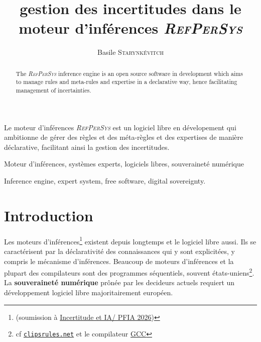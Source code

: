 \documentclass[french]{pfia}
\author{Basile \textsc{Starynkévitch}\\
    {\relsize{-1}{\href{mailto:basile@starynkevitch.net}{\texttt{basile@starynkevitch.net}}}}}
\date{\rpsgitdate}
\newcommand{\RefPerSys}{{\textit{\textsc{RefPerSys}}}}
\begin{document}
\title{gestion des incertitudes dans le moteur d'inférences \RefPerSys}

  \maketitle

  \begin{resume}
    Le moteur d'inférences \RefPerSys{} est un logiciel libre en
    dévelopement qui ambitionne de gérer des règles et des méta-règles
    et des expertises de manière déclarative, facilitant ainsi la
    gestion des incertitudes.
  \end{resume}

\begin{motscles}
Moteur d'inférences, systèmes experts, logiciels libres, souveraineté numérique
\end{motscles}

\begin{abstract}
The \RefPerSys{} inference engine is an open source software in
development which aims to manage rules and meta-rules and expertise in
a declarative way, hence facilitating management of incertainties.
\end{abstract}

\begin{keywords}
Inference engine, expert system, free software, digital sovereignty.
\end{keywords}

\section{Introduction}
Les moteurs d'inférences\footnote{(soumission à
\href{https://pfia26.cril.fr/journées/journee3/incertitude-ia/}{Incertitude
  et IA/ PFIA 2026})} existent depuis
longtemps\cite{Pitrat:1982:decr-conn-decl, Starynkevitch-1990-EUM,
  Pitrat:2009:ArtifBeings, Starynkevitch-JDLL-2025, dormoy:1992:meta,
  Lauriere:1986:snark} et le logiciel libre
aussi\cite{Weber:2004:SuccessOpenSource}. Ils se caractérisent par la
déclarativité des connaissances qui y sont
explicitées\cite{fouet-starynkevitch:describing-control:1987}, y
compris le mécanisme d'inférences. Beaucoup de moteurs d'inférences et
la plupart des compilateurs\cite{Starynkevitch-DSL2011,
  queinnec:2003:lisp, serrano:1995:bigloo,
  Chailloux:2000:applications-ocaml} sont des programmes séquentiels,
souvent états-uniens\footnote{cf
\href{https://www.clipsrules.net/}{\texttt{clipsrules.net}} et le
compilateur \href{https://gcc.gnu.org}{GCC}}. La \textbf{souveraineté
  numérique} prônée par les decideurs actuels requiert un
développement logiciel libre majoritairement européen.
\end{document}
